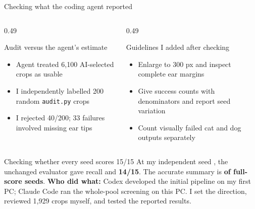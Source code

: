 \documentclass[aspectratio=169,10pt,t]{beamer}
\begin{document}
\begin{frame}{Checking what the coding agent reported}
\begin{columns}[T]
\begin{column}{0.49\linewidth}
\begin{block}{Audit versus the agent's estimate}
\small\begin{itemize}\setlength{\itemsep}{2pt}
\item Agent treated 6{,}100 AI-selected crops as usable
\item I independently labelled 200 random \texttt{audit.py} crops
\item I rejected 40/200; 33 failures involved missing ear tips
\end{itemize}
\end{block}
\end{column}
\begin{column}{0.49\linewidth}
\begin{block}{Guidelines I added after checking}
\small\begin{itemize}\setlength{\itemsep}{2pt}
\item Enlarge to 300 px and inspect complete ear margins
\item Give success counts with denominators and report seed variation
\item Count visually failed cat and dog outputs separately
\end{itemize}
\end{block}
\end{column}
\end{columns}
\vspace{2pt}
\begin{block}{Checking whether every seed scores 15/15}
\footnotesize At my independent seed \lowSeed{}, the unchanged evaluator gave recall \lowRecall{} and \textbf{14/15}. The accurate summary is \textbf{\nFifteen{} of \nSeeds{} full-score seeds}. \textbf{Who did what:} Codex developed the initial pipeline on my first PC; Claude Code ran the whole-pool screening on this PC. I set the direction, reviewed 1{,}929 crops myself, and tested the reported results.
\end{block}
\end{frame}
\end{document}
